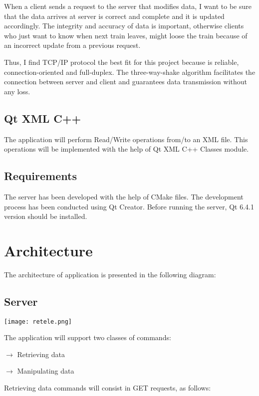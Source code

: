 \documentclass[runningheads]{llncs}
\begin{document}
When a client sends a request to the server that modifies data, I want to be sure that the data arrives at server is correct and complete and it is updated accordingly. The integrity and accuracy of data is important, otherwise clients who just want to know when next train leaves, might loose the train because of an incorrect update from a previous request. 

Thus, I find TCP/IP protocol the best fit for this project \cite{ref_url1} because is reliable, connection-oriented and full-duplex. The three-way-shake algorithm facilitates the connection between server and client and guarantees data transmission without any loss.

\subsection{Qt XML C++}
The application will perform Read/Write operations from/to an XML file. This operations will be implemented with the help of Qt XML C++ Classes module. \cite{ref_url3}

\subsection{Requirements}

\par The server has been developed with the help of CMake files. The development process has been conducted using Qt Creator. Before running the server, Qt 6.4.1 version should be installed.\cite{qt}

\section{Architecture}

The architecture of application is presented in the following diagram:

\subsection{Server}
\hspace*{-1.2in}
\texttt{[image: retele.png]}


The application will support two classes of commands:

$\rightarrow$ Retrieving data

$\rightarrow$ Manipulating data

Retrieving data commands will consist in GET requests, as follows:
\end{document}
